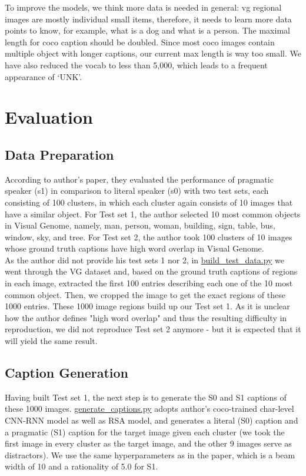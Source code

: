 \documentclass[a4paper]{scrartcl}
\begin{document}
To improve the models, we think more data is needed in general: vg regional images are mostly individual small items, therefore, it needs to learn more data points to know, for example, what is a dog and what is a person. The maximal length for coco caption should be doubled. Since most coco images contain multiple object with longer captions, our current max length is way too small. We have also reduced the vocab to less than 5,000, which leads to a frequent appearance of `UNK'. 

\section*{Evaluation}
\subsection*{Data Preparation}
According to author's paper, they evaluated the performance of pragmatic speaker (s1) in comparison to literal speaker (s0) with two test sets, each consisting of 100 clusters, in which each cluster again consists of 10 images that have a similar object. For Test set 1, the author selected 10 most common objects in Visual Genome, namely, man, person, woman, building, sign, table, bus, window, sky, and tree. For Test set 2, the author took 100 clusters of 10 images whose ground truth captions have high word overlap in Visual Genome.\\

As the author did not provide his test sets 1 nor 2, in \href{https://github.com/Meng3www/PPlusPlus/blob/main/evaluate/build\_test\_data.py}{build\_test\_data.py} we went through the VG dataset and, based on the ground truth captions of regions in each image, extracted the first 100 entries describing each one of the 10 most common object. Then, we cropped the image to get the exact regions of these 1000 entries. These 1000 image regions build up our Test set 1. As it is unclear how the author defines "high word overlap" and thus the resulting difficulty in reproduction, we did not reproduce Test set 2 anymore - but it is expected that it will yield the same result.\\

\subsection*{Caption Generation}
Having built Test set 1, the next step is to generate the S0 and S1 captions of these 1000 images. \href{https://github.com/Meng3www/PPlusPlus/blob/main/evaluate/generate\_captions.py}{generate\_captions.py} adopts author's coco-trained char-level CNN-RNN model as well as RSA model, and generates a literal (S0) caption and a pragmatic (S1) caption for the target image given each cluster (we took the first image in every cluster as the target image, and the other 9 images serve as distractors). We use the same hyperparameters as in the paper, which is a beam width of 10 and a rationality of 5.0 for S1.\\
\end{document}
